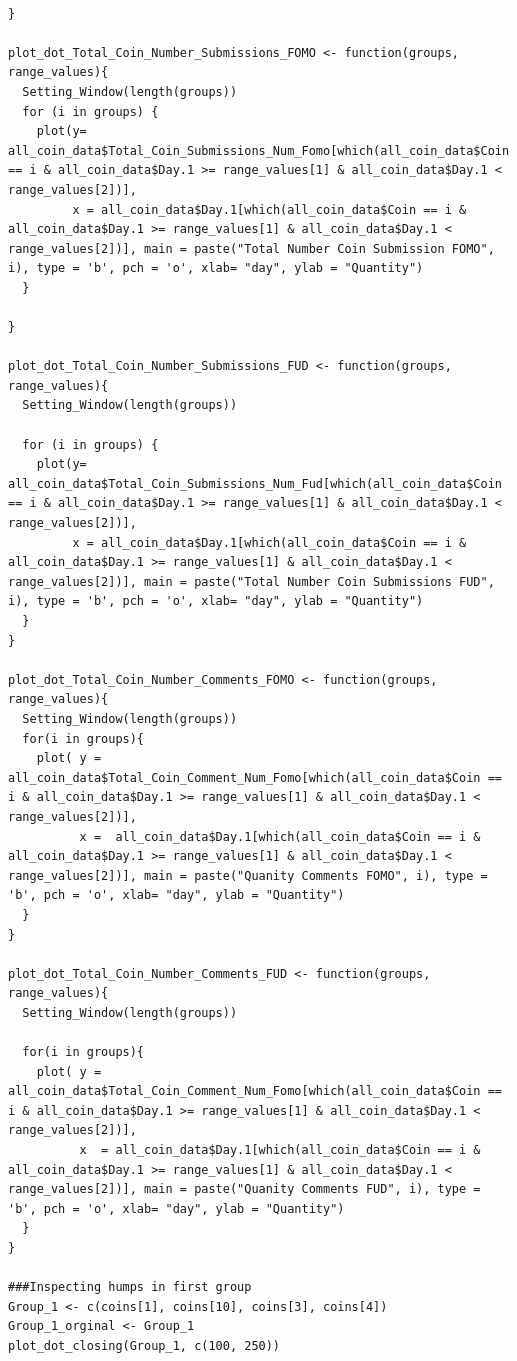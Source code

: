 \documentclass[12pt]{article}
\begin{document}
{\begin{verbatim}
  
}

plot_dot_Total_Coin_Number_Submissions_FOMO <- function(groups, range_values){
  Setting_Window(length(groups))
  for (i in groups) {
    plot(y= all_coin_data$Total_Coin_Submissions_Num_Fomo[which(all_coin_data$Coin == i & all_coin_data$Day.1 >= range_values[1] & all_coin_data$Day.1 < range_values[2])], 
         x = all_coin_data$Day.1[which(all_coin_data$Coin == i & all_coin_data$Day.1 >= range_values[1] & all_coin_data$Day.1 < range_values[2])], main = paste("Total Number Coin Submission FOMO", i), type = 'b', pch = 'o', xlab= "day", ylab = "Quantity")
  }
  
}

plot_dot_Total_Coin_Number_Submissions_FUD <- function(groups, range_values){
  Setting_Window(length(groups))
  
  for (i in groups) {
    plot(y= all_coin_data$Total_Coin_Submissions_Num_Fud[which(all_coin_data$Coin == i & all_coin_data$Day.1 >= range_values[1] & all_coin_data$Day.1 < range_values[2])], 
         x = all_coin_data$Day.1[which(all_coin_data$Coin == i & all_coin_data$Day.1 >= range_values[1] & all_coin_data$Day.1 < range_values[2])], main = paste("Total Number Coin Submissions FUD", i), type = 'b', pch = 'o', xlab= "day", ylab = "Quantity")
  }
}

plot_dot_Total_Coin_Number_Comments_FOMO <- function(groups, range_values){
  Setting_Window(length(groups))
  for(i in groups){
    plot( y = all_coin_data$Total_Coin_Comment_Num_Fomo[which(all_coin_data$Coin == i & all_coin_data$Day.1 >= range_values[1] & all_coin_data$Day.1 < range_values[2])],
          x =  all_coin_data$Day.1[which(all_coin_data$Coin == i & all_coin_data$Day.1 >= range_values[1] & all_coin_data$Day.1 < range_values[2])], main = paste("Quanity Comments FOMO", i), type = 'b', pch = 'o', xlab= "day", ylab = "Quantity")
  }
}

plot_dot_Total_Coin_Number_Comments_FUD <- function(groups, range_values){
  Setting_Window(length(groups))
  
  for(i in groups){
    plot( y = all_coin_data$Total_Coin_Comment_Num_Fomo[which(all_coin_data$Coin == i & all_coin_data$Day.1 >= range_values[1] & all_coin_data$Day.1 < range_values[2])],
          x  = all_coin_data$Day.1[which(all_coin_data$Coin == i & all_coin_data$Day.1 >= range_values[1] & all_coin_data$Day.1 < range_values[2])], main = paste("Quanity Comments FUD", i), type = 'b', pch = 'o', xlab= "day", ylab = "Quantity")
  }
}

###Inspecting humps in first group
Group_1 <- c(coins[1], coins[10], coins[3], coins[4])
Group_1_orginal <- Group_1
plot_dot_closing(Group_1, c(100, 250))


\end{verbatim}}
\end{document}
